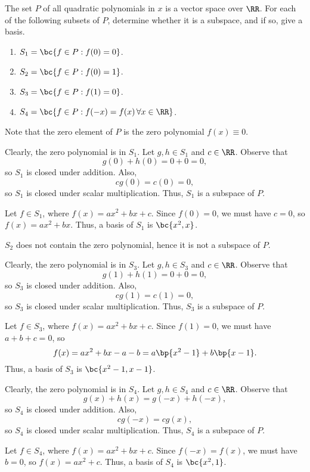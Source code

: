 \begin{problem}
    The set $P$ of all quadratic polynomials in $x$ is a vector space over $\RR$. For each of the following subsets of $P$, determine whether it is a subspace, and if so, give a basis.

    \begin{enumerate}
        \item $S_1 = \bc{f \in P : f(0) = 0}$.
        \item $S_2 = \bc{f \in P : f(0) = 1}$.
        \item $S_3 = \bc{f \in P : f(1) = 0}$.
        \item $S_4 = \bc{f \in P : f(-x) = f(x) \, \forall x \in \RR}$.
    \end{enumerate}
\end{problem}
\begin{solution}
    Note that the zero element of $P$ is the zero polynomial $f(x) \equiv 0$.

    \begin{ppart}
        Clearly, the zero polynomial is in $S_1$. Let $g, h \in S_1$ and $c \in \RR$. Observe that \[g(0) + h(0) = 0 + 0 = 0,\] so $S_1$ is closed under addition. Also, \[cg(0) = c(0) = 0,\] so $S_1$ is closed under scalar multiplication. Thus, $S_1$ is a subspace of $P$.

        Let $f \in S_1$, where $f(x) = ax^2 + bx + c$. Since $f(0) = 0$, we must have $c = 0$, so $f(x) = ax^2 +bx$. Thus, a basis of $S_1$ is $\bc{x^2, x}$.
    \end{ppart}
    \begin{ppart}
        $S_2$ does not contain the zero polynomial, hence it is not a subspace of $P$.
    \end{ppart}
    \begin{ppart}
        Clearly, the zero polynomial is in $S_3$. Let $g, h \in S_3$ and $c \in \RR$. Observe that \[g(1) + h(1) = 0 + 0 = 0,\] so $S_3$ is closed under addition. Also, \[cg(1) = c(1) = 0,\] so $S_3$ is closed under scalar multiplication. Thus, $S_3$ is a subspace of $P$.

        Let $f \in S_3$, where $f(x) = ax^2 + bx + c$. Since $f(1) = 0$, we must have $a + b + c = 0$, so \[f(x) = ax^2 +bx - a - b = a\bp{x^2 - 1} + b\bp{x -1}.\] Thus, a basis of $S_3$ is $\bc{x^2 - 1, x - 1}$.
    \end{ppart}
    \begin{ppart}
        Clearly, the zero polynomial is in $S_4$. Let $g, h \in S_4$ and $c \in \RR$. Observe that \[g(x) + h(x) = g(-x) + h(-x),\] so $S_4$ is closed under addition. Also, \[cg(-x) = cg(x),\] so $S_4$ is closed under scalar multiplication. Thus, $S_4$ is a subspace of $P$.

        Let $f \in S_4$, where $f(x) = ax^2 + bx + c$. Since $f(-x) = f(x)$, we must have $b = 0$, so $f(x) = ax^2 + c$. Thus, a basis of $S_4$ is $\bc{x^2, 1}$.
    \end{ppart}
\end{solution}

